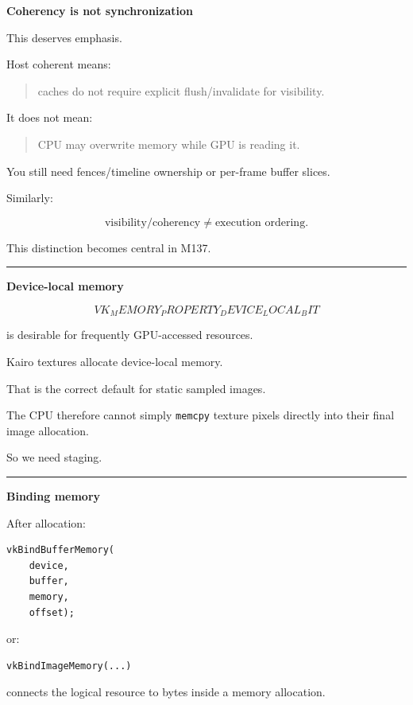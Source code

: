 \textbf{Coherency is not synchronization}

This deserves emphasis.

Host coherent means:

\begin{quote}
caches do not require explicit flush/invalidate for visibility.
\end{quote}

It does not mean:

\begin{quote}
CPU may overwrite memory while GPU is reading it.
\end{quote}

You still need fences/timeline ownership or per-frame buffer slices.

Similarly:

\[
\boxed{
\text{visibility/coherency}
\neq
\text{execution ordering}.
}
\]

This distinction becomes central in M137.

\begin{center}\rule{0.5\linewidth}{0.5pt}\end{center}

\textbf{Device-local memory}

\[
VK_MEMORY_PROPERTY_DEVICE_LOCAL_BIT
\]

is desirable for frequently GPU-accessed resources.

Kairo textures allocate device-local memory.

That is the correct default for static sampled images.

The CPU therefore cannot simply \texttt{memcpy} texture pixels directly into their final image allocation.

So we need staging.

\begin{center}\rule{0.5\linewidth}{0.5pt}\end{center}

\textbf{Binding memory}

After allocation:

\begin{verbatim}
vkBindBufferMemory(
    device,
    buffer,
    memory,
    offset);
\end{verbatim}

or:

\begin{verbatim}
vkBindImageMemory(...)
\end{verbatim}

connects the logical resource to bytes inside a memory allocation.


